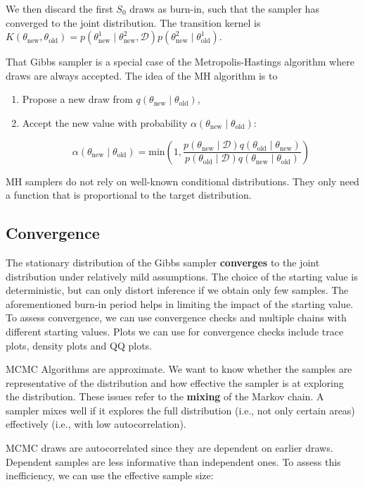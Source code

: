 We then discard the first $S_0$ draws as burn-in, such that the sampler has converged to the joint distribution. The transition kernel is $K(\theta_{\text{new}},\theta_{\text{old}}) = p(\theta^1_\text{new}\mid\theta^2_\text{new},\mathcal{D})p(\theta^2_\text{new}\mid\theta^1_\text{old})$. 

That Gibbs sampler is a special case of the Metropolis-Hastings algorithm where draws are always accepted. The idea of the MH algorithm is to 

\begin{enumerate}
	\item Propose a new draw from $q(\theta_\text{new}\mid\theta_\text{old})$,
	\item Accept the new value with probability $\alpha(\theta_\text{new}\mid\theta_\text{old})$:
	
	\[
		\alpha(\theta_\text{new}\mid\theta_\text{old}) = \mathrm{min}\left(1,\frac{p(\theta_\text{new}\mid\mathcal{D})q(\theta_\text{old}\mid\theta_\text{new})}{p(\theta_\text{old}\mid\mathcal{D})q(\theta_\text{new}\mid\theta_\text{old})}\right)
	\]
\end{enumerate}

MH samplers do not rely on well-known conditional distributions. They only need a function that is proportional to the target distribution.

\subsection{Convergence}

The stationary distribution of the Gibbs sampler \textbf{converges} to the joint distribution under relatively mild assumptions. The choice of the starting value is deterministic, but can only distort inference if we obtain only few samples. The aforementioned burn-in period helps in limiting the impact of the starting value. To assess convergence, we can use convergence checks and multiple chains with different starting values. Plots we can use for convergence checks include trace plots, density plots and QQ plots.

MCMC Algorithms are approximate. We want to know whether the samples are representative of the distribution and how effective the sampler is at exploring the distribution. These issues refer to the \textbf{mixing} of the Markov chain. A sampler mixes well if it explores the full distribution (i.e., not only certain areas) effectively (i.e., with low autocorrelation).

MCMC draws are autocorrelated since they are dependent on earlier draws. Dependent samples are less informative than independent ones. To assess this inefficiency, we can use the effective sample size:

